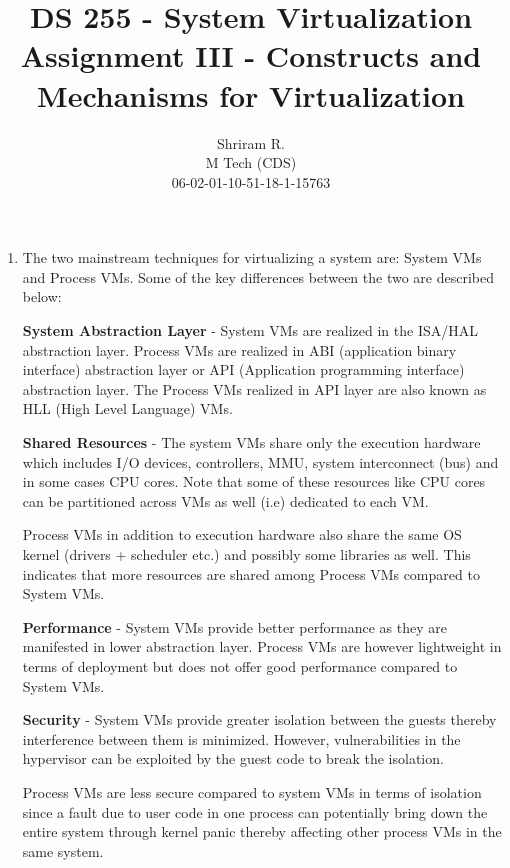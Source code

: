 \documentclass[11pt,a4paper,oneside]{article}
\begin{document}
	\title{DS 255 - System Virtualization \\ Assignment III - Constructs and Mechanisms for Virtualization}
	\author{Shriram R. \\ M Tech (CDS) \\ 06-02-01-10-51-18-1-15763}
	\maketitle	
	
	\begin{enumerate}
		\item The two mainstream techniques for virtualizing a system are: System VMs and Process VMs. Some of the key differences between the two are described below:
		
		\textbf{System Abstraction Layer} - System VMs are realized in the ISA/HAL abstraction layer. Process VMs are realized in ABI (application binary interface) abstraction layer or API (Application programming interface) abstraction layer. The Process VMs realized in API layer are also known as HLL (High Level Language) VMs.
		
		\textbf{Shared Resources} - The system VMs share only the execution hardware which includes I/O devices, controllers, MMU, system interconnect (bus) and in some cases CPU cores. Note that some of these resources like CPU cores can be partitioned across VMs as well (i.e) dedicated to each VM.
		
		Process VMs in addition to execution hardware also share the same OS kernel (drivers + scheduler etc.) and possibly some libraries as well. This indicates that more resources are shared among Process VMs compared to System VMs.
		
		\textbf{Performance} - System VMs provide better performance as they are manifested in lower abstraction layer. Process VMs are however lightweight in terms of deployment but does not offer good performance compared to System VMs.
		
		\textbf{Security} - System VMs provide greater isolation between the guests thereby interference between them is minimized. However, vulnerabilities in the hypervisor can be exploited by the guest code to break the isolation.
		
		Process VMs are less secure compared to system VMs in terms of isolation since a fault due to user code in one process can potentially bring down the entire system through kernel panic thereby affecting other process VMs in the same system.
		

\end{enumerate}
\end{document}
